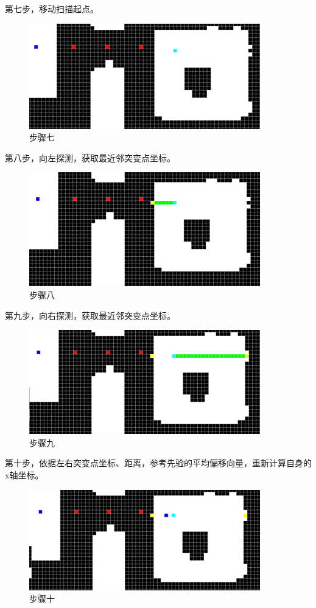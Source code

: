 第七步，移动扫描起点。

\begin{figure}[!htbp]
\centering
\includegraphics[scale=1]{figures/QR_Prf/图片7.png}
\caption{步骤七}
\end{figure}

第八步，向左探测，获取最近邻突变点坐标。

\begin{figure}[!htbp]
\centering
\includegraphics[scale=1]{figures/QR_Prf/图片8.png}
\caption{步骤八}
\end{figure}

第九步，向右探测，获取最近邻突变点坐标。

\begin{figure}[!htbp]
\centering
\includegraphics[scale=1]{figures/QR_Prf/图片9.png}
\caption{步骤九}
\end{figure}

第十步，依据左右突变点坐标、距离，参考先验的平均偏移向量，重新计算自身的x轴坐标。

\begin{figure}[!htbp]
\centering
\includegraphics[scale=1]{figures/QR_Prf/图片10.png}
\caption{步骤十}
\end{figure}


